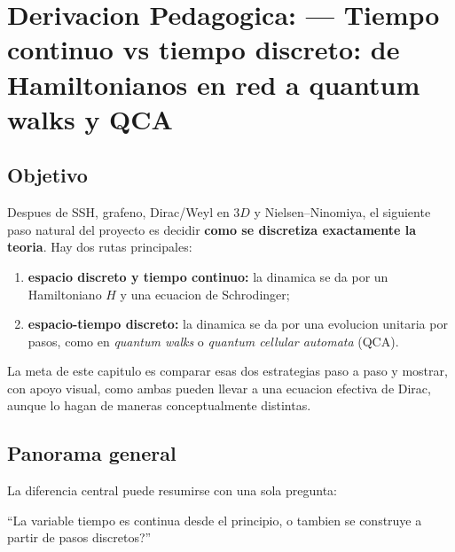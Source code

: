 \chapter{Derivacion Pedagogica: --- Tiempo continuo vs tiempo discreto: de Hamiltonianos en red a quantum walks y QCA}
\label{ch:tiempo-continuo-vs-qw-qca}







\section{Objetivo}

Despues de SSH, grafeno, Dirac/Weyl en \(3D\) y Nielsen--Ninomiya, el siguiente paso natural del proyecto es decidir \textbf{como se discretiza exactamente la teoria}. Hay dos rutas principales:

\begin{enumerate}[leftmargin=*]
  \item \textbf{espacio discreto y tiempo continuo:} la dinamica se da por un Hamiltoniano \(H\) y una ecuacion de Schrodinger;
  \item \textbf{espacio-tiempo discreto:} la dinamica se da por una evolucion unitaria por pasos, como en \emph{quantum walks} o \emph{quantum cellular automata} (QCA).
\end{enumerate}

La meta de este capitulo es comparar esas dos estrategias paso a paso y mostrar, con apoyo visual, como ambas pueden llevar a una ecuacion efectiva de Dirac, aunque lo hagan de maneras conceptualmente distintas.

\section{Panorama general}

La diferencia central puede resumirse con una sola pregunta:

\begin{displayquote}
\enquote{La variable tiempo es continua desde el principio, o tambien se construye a partir de pasos discretos?}
\end{displayquote}

